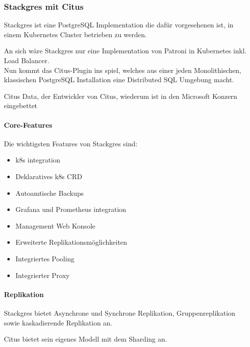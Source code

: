 \subsubsection{Stackgres mit Citus}
\begin{flushleft} 
    Stackgres ist eine PostgreSQL Implementation die dafür vorgesehenen ist, in einem Kubernetes Cluster betrieben zu werden.
\end{flushleft} 
\begin{flushleft}
    An sich wäre Stackgres nur eine Implementation von Patroni in Kubernetes inkl.
    Load Balancer.\\
    Nun kommt das Citus-Plugin ins spiel, welches aus einer jeden Monolithischen, klassischen PostgreSQL Installation eine Distributed SQL Umgebung macht.
\end{flushleft}
\begin{flushleft}
    Citus Data, der Entwickler von Citus, wiederum ist in den Microsoft Konzern eingebettet
\end{flushleft}
\begin{flushleft}
    \paragraph{Core-Features}
    Die wichtigsten Features von Stackgres sind\cite{G3XQA8PI}:
    \begin{itemize}
        \item k8s integration
        \item Deklaratives k8s CRD
        \item Autoamtische Backups
        \item Grafana und Prometheus integration
        \item Management Web Konsole
        \item Erweiterte Replikationsmöglichkeiten
        \item Integriertes Pooling
        \item Integrierter Proxy
    \end{itemize}
\end{flushleft}
\begin{flushleft}
    \paragraph{Replikation}
    Stackgres bietet Asynchrone und Synchrone Replikation, Gruppenreplikation sowie kaskadierende Replikation an.
\end{flushleft}
\begin{flushleft}
    Citus bietet sein eigenes Modell mit dem Sharding an.
\end{flushleft}
